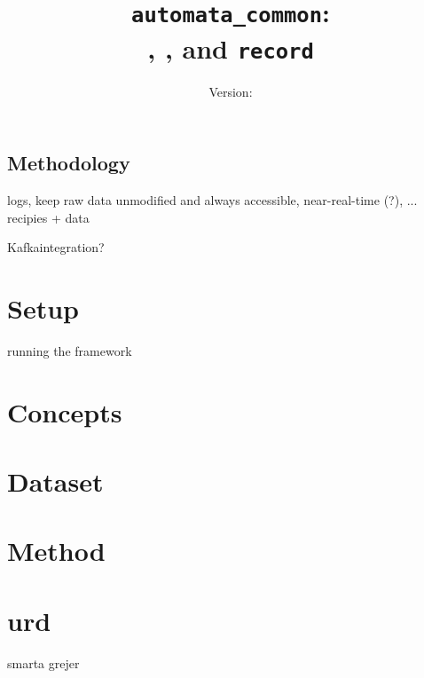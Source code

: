 \documentclass[a4paper]{report}
\title{\texttt{automata\_common}:\\ \jobtuple, \joblist, and \texttt{record}}
\author{Version: \inputfile{gitrevision}}
\date{}
\begin{document}




%


\section{Methodology}
logs, keep raw data unmodified and always accessible, near-real-time (?), ...
recipies + data

Kafkaintegration?

\chapter{Setup}


running the framework

\chapter{Concepts}


\chapter{Dataset}


\chapter{Method}


\chapter{urd}


%
%




%


%


smarta grejer



\end{document}
